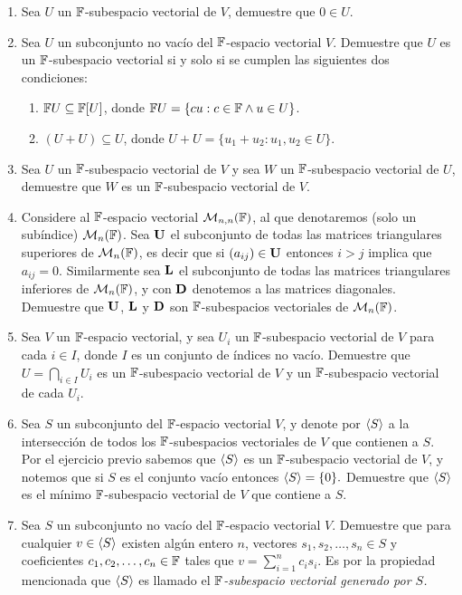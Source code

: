 \begin{enumerate}
  \item Sea $U$ un $\mathbb{F}$-subespacio vectorial de $V$, demuestre que $0 \in U$.
  
  \item Sea $U$ un subconjunto no vacío del $\mathbb{F}$-espacio vectorial $V$. Demuestre que $U$ es un $\mathbb{F}$-subespacio vectorial si y solo si se cumplen las siguientes dos condiciones:
    \begin{enumerate}
      \item $\mathbb{F} U \subseteq \mathbb{F}[U]$, donde $\mathbb{F} U = \{cu : c \in \mathbb{F} \land u \in U\}$.
      \item $(U + U) \subseteq U$, donde $U+U = \{u_1 + u_2 \colon u_1, u_2 \in U\}$.
    \end{enumerate}

  \item Sea $U$ un $\mathbb{F}$-subespacio vectorial de $V$ y sea $W$ un $\mathbb{F}$-subespacio vectorial de $U$, demuestre que $W$ es un $\mathbb{F}$-subespacio vectorial de $V$.
  
  \item Considere al $\mathbb{F}$-espacio vectorial $\mathcal{M}_{n,n} ( \mathbb{F} )$, al que denotaremos (solo un subíndice) $\mathcal{M}_n(\mathbb{F})$. Sea $\mathbf{U}$ el subconjunto de todas las matrices triangulares superiores de $\mathcal{M}_n(\mathbb{F})$, es decir que si $(a_{ij}) \in \mathbf{U}$ entonces $i > j$ implica que $a_{ij} = 0$. Similarmente sea $\mathbf{L}$ el subconjunto de todas las matrices triangulares inferiores de $\mathcal{M}_n(\mathbb{F})$, y con $\mathbf{D}$ denotemos a las matrices diagonales. Demuestre que $\mathbf{U}$, $\mathbf{L}$ y $\mathbf{D}$ son $\mathbb{F}$-subespacios vectoriales de $\mathcal{M}_n(\mathbb{F})$.
  
  \item Sea $V$ un $\mathbb{F}$-espacio vectorial, y sea $U_i$ un $\mathbb{F}$-subespacio vectorial de $V$ para cada $i \in I$, donde $I$ es un conjunto de índices no vacío. Demuestre que $U = \bigcap_{i \in I} U_i$ es un $\mathbb{F}$-subespacio vectorial de $V$ y un $\mathbb{F}$-subespacio vectorial de cada $U_i$.
  
  \item Sea $S$ un subconjunto del $\mathbb{F}$-espacio vectorial $V$, y denote por $\langle S\rangle$ a la intersección de todos los $\mathbb{F}$-subespacios vectoriales de $V$ que contienen a $S$. Por el ejercicio previo sabemos que $\langle S\rangle$ es un $\mathbb{F}$-subespacio vectorial de $V$, y notemos que si $S$ es el conjunto vacío entonces $\langle S\rangle = \{ 0 \}.$ Demuestre que $\langle S\rangle$ es el mínimo $\mathbb{F}$-subespacio vectorial de $V$ que contiene a $S$.
  
  \item Sea $S$ un subconjunto no vacío del $\mathbb{F}$-espacio vectorial $V$. Demuestre que para cualquier $v \in \langle S\rangle$ existen algún entero $n$, vectores $s_1, s_2, \ldots, s_n \in S$ y coeficientes $c_1, c_2, \ldots, c_n \in \mathbb{F}$ tales que $v = \sum _{i=1}^n c_i s_i$. Es por la propiedad mencionada que $\langle S\rangle$ es llamado el \emph{$\mathbb{F}$-subespacio vectorial generado por $S$.}
  


\end{enumerate}
